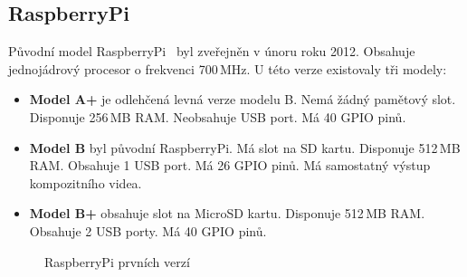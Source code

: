 	\subsection{RaspberryPi}
	Původní model RaspberryPi~\cite{RaspiOne} byl zveřejněn v únoru roku 2012. Obsahuje jednojádrový procesor o frekvenci 700\,MHz. U této verze existovaly tři modely:
	
		\begin{itemize}
		\item \textbf{Model A+} je odlehčená levná verze modelu B. Nemá žádný pamětový slot. Disponuje 256\,MB RAM. Neobsahuje USB port. Má 40 GPIO pinů.
		\item \textbf{Model B} byl původní RaspberryPi. Má slot na SD kartu. Disponuje 512\,MB RAM. Obsahuje 1 USB port. Má 26 GPIO pinů. Má samostatný výstup kompozitního videa.
		\item \textbf{Model B+} obsahuje slot na MicroSD kartu. Disponuje 512\,MB RAM. Obsahuje 2 USB porty. Má 40 GPIO pinů.
	\end{itemize}
	
\begin{figure}[!ht]
    \centering
			\hspace*{5mm}
			\hspace*{5mm}
		\caption{RaspberryPi prvních verzí}
		\vspace{-20pt}	
\end{figure}
	
